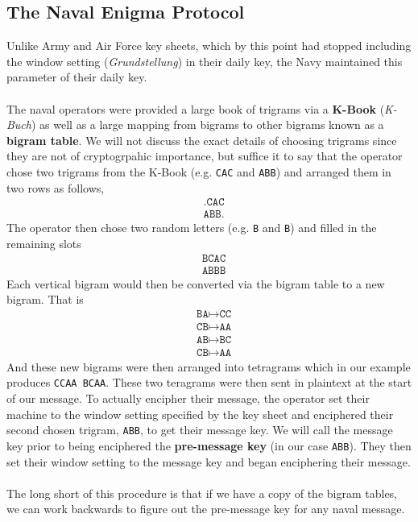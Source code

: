\subsection{The Naval Enigma Protocol}
Unlike Army and Air Force key sheets, which by this point had stopped
including the window setting (\emph{Grundstellung}) in their daily
key, the Navy maintained this parameter of their daily key.
\\\\The naval operators were provided a large book of trigrams via a
{\bf{{K-Book}}} (\emph{K-Buch}) as well as a large mapping from
bigrams to other bigrams known as a {\bf{bigram table}}. We will not
discuss the exact details of choosing trigrams since they are not of
cryptogrpahic importance, but suffice it to say that the operator
chose two trigrams from the K-Book (e.g. \texttt{CAC} and
\texttt{ABB}) and arranged them in two rows as follows,
\begin{align*}
  & \texttt{.CAC} \\
  & \texttt{ABB.}
\end{align*}
The operator then chose two random letters (e.g. \texttt{B} and
\texttt{B}) and filled in the remaining slots
\begin{align*}
  & \texttt{BCAC} \\
  & \texttt{ABBB}
\end{align*}
Each vertical bigram would then be converted via the bigram table to
a new bigram. That is
\begin{align*}
  & \texttt{BA} \mapsto \texttt{CC} \\
  & \texttt{CB} \mapsto \texttt{AA} \\
  & \texttt{AB} \mapsto \texttt{BC} \\
  & \texttt{CB} \mapsto \texttt{AA}
\end{align*}
And these new bigrams were then arranged into tetragrams which in our
example produces \texttt{CCAA BCAA}. These two teragrams were then
sent in plaintext at the start of our message. To actually encipher
their message, the operator set their machine to the window setting
specified by the key sheet and enciphered their second chosen
trigram, \texttt{ABB}, to get their message key. We will call the message
key prior to being enciphered the {\bf{pre-message key}} (in our
case \texttt{ABB}). They then set their window setting to the
message key and began enciphering their message.
\\\\The long short of this procedure is that if we have a copy of
the bigram tables, we can work backwards to figure out the
pre-message key for any naval message.

